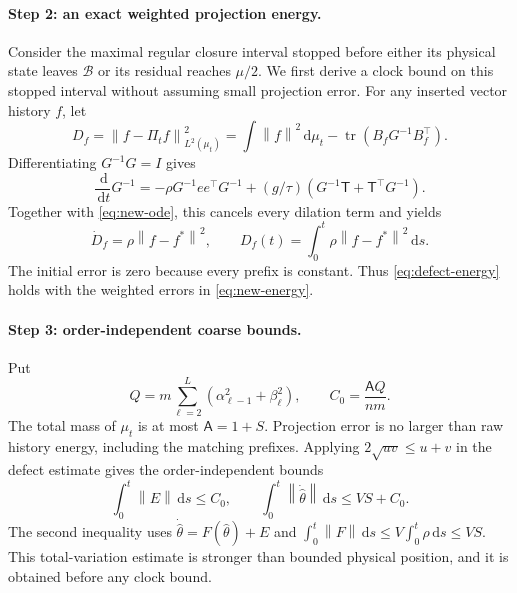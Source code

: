 \documentclass[11pt]{article}
\theoremstyle{definition}
\theoremstyle{remark}
\newcommand{\norm}[1]{\left\lVert #1\right\rVert}
\newcommand{\dd}{\,\mathrm{d}}
\begin{document}
\paragraph{Step 2: an exact weighted projection energy.}
Consider the maximal regular closure interval stopped before either its
physical state leaves $\mathcal B$ or its residual reaches $\mu/2$.  We first
derive a clock bound on this stopped interval without assuming small projection
error.  For any inserted vector history $f$, let
\[
 D_f=\norm{f-\Pi_t f}_{L^2(\mu_t)}^2
 =\int\norm f^2\dd\mu_t-\operatorname{tr}(B_fG^{-1}B_f^\top).
\]
Differentiating $G^{-1}G=I$ gives
\[
 \frac{\dd}{\dd t}G^{-1}
 =-\rho G^{-1}ee^\top G^{-1}
 +(g/\tau)(G^{-1}\mathsf T+\mathsf T^\top G^{-1}).
\]
Together with \eqref{eq:new-ode}, this cancels every dilation term and yields
\begin{equation}
 \dot D_f=\rho\norm{f-f^*}^2,\qquad
 D_f(t)=\int_0^t\rho\norm{f-f^*}^2\dd s.             \label{eq:new-energy}
\end{equation}
The initial error is zero because every prefix is constant.  Thus
\eqref{eq:defect-energy} holds with the weighted errors in
\eqref{eq:new-energy}.

\paragraph{Step 3: order-independent coarse bounds.}
Put
\[
 Q=m\sum_{\ell=2}^L(\alpha_{\ell-1}^2+\beta_\ell^2),
 \qquad C_0=\frac{\mathsf A Q}{nm}.
\]
The total mass of $\mu_t$ is at most $\mathsf A=1+S$.  Projection error is no
larger than raw history energy, including the matching prefixes.  Applying
$2\sqrt{uv}\le u+v$ in the defect estimate gives the order-independent bounds
\begin{equation}
 \int_0^t\norm E\dd s\le C_0,\qquad
 \int_0^t\norm{\dot{\widehat\theta}}\dd s
 \le VS+C_0.                                         \label{eq:coarse-new}
\end{equation}
The second inequality uses $\dot{\widehat\theta}=F(\widehat\theta)+E$ and
$\int_0^t\norm F\dd s\le V\int_0^t\rho\dd s\le VS$.  This total-variation
estimate is stronger than bounded physical position, and it is obtained before
any clock bound.
\end{document}
